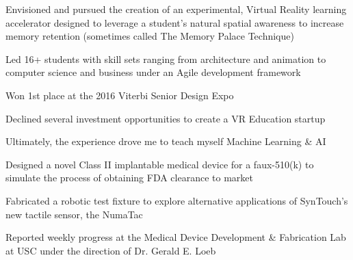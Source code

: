 \documentclass[letterpaper]{deedy-resume} %
\begin{document}
\begin{minipage}[t]{0.66\textwidth}
\begin{tightitemize}
\item Envisioned and pursued the creation of an experimental, Virtual Reality learning accelerator designed to leverage a student's natural spatial awareness to increase memory retention (sometimes called The Memory Palace Technique)
\item Led 16+ students with skill sets ranging from architecture and animation to computer science and business under an Agile development framework
\item Won 1st place at the 2016 Viterbi Senior Design Expo 
\item Declined several investment opportunities to create a VR Education startup 
\item Ultimately, the experience drove me to teach myself Machine Learning \& AI
\end{tightitemize}

\sectionspace



\begin{tightitemize}
\item Designed a novel Class II implantable medical device for a faux-510(k) to simulate the process of obtaining FDA clearance to market
\end{tightitemize}

\sectionspace %



\begin{tightitemize}
\item Fabricated a robotic test fixture to explore alternative applications of SynTouch's new tactile sensor, the NumaTac
\item Reported weekly progress at the Medical Device Development \& Fabrication Lab at USC under the direction of Dr. Gerald E. Loeb 
\end{tightitemize}

\sectionspace %



\end{minipage} %
\end{document}
